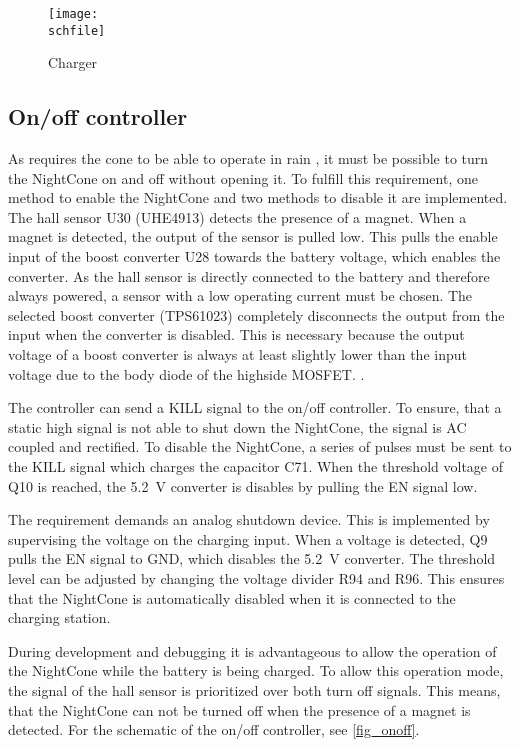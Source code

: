 \begin{figure}[h!]
    \centering
    \texttt{[image: \\schfile]}
    \caption{Charger}
    \label{fig_charger}
\end{figure}

\FloatBarrier

\subsection{On/off controller}
\label{sec_onoff}

As  requires the cone to be able to operate in rain , it must be possible to turn the NightCone on and off without opening it. To fulfill this requirement, one method to enable the NightCone and two methods to disable it are implemented. The hall sensor U30 (UHE4913) detects the presence of a magnet. When a magnet is detected, the output of the sensor is pulled low. This pulls the enable input of the boost converter U28 towards the battery voltage, which enables the converter. As the hall sensor is directly connected to the battery and therefore always powered, a sensor with a low operating current must be chosen. The selected boost converter (TPS61023) completely disconnects the output from the input when the converter is disabled. This is necessary because the output voltage of a boost converter is always at least slightly lower than the input voltage due to the body diode of the highside \ac{MOSFET}. \cite{TI:TPS61023}. 

The controller can send a KILL signal to the on/off controller. To ensure, that a static high signal is not able to shut down the NightCone, the signal is AC coupled and rectified. To disable the NightCone, a series of pulses must be sent to the KILL signal which charges the capacitor C71. When the threshold voltage of Q10 is reached, the \SI{5.2}{\volt} converter is disables by pulling the EN signal low. 

The requirement  demands an analog shutdown device. This is implemented by supervising the voltage on the charging input. When a voltage is detected, Q9 pulls the EN signal to GND, which disables the \SI{5.2}{\volt} converter. The threshold level can be adjusted by changing the voltage divider R94 and R96. This ensures that the NightCone is automatically disabled when it is connected to the charging station. 

During development and debugging it is advantageous to allow the operation of the NightCone while the battery is being charged. To allow this operation mode, the signal of the hall sensor is prioritized over both turn off signals. This means, that the NightCone can not be turned off when the presence of a magnet is detected. For the schematic of the on/off controller, see \autoref{fig_onoff}. 


